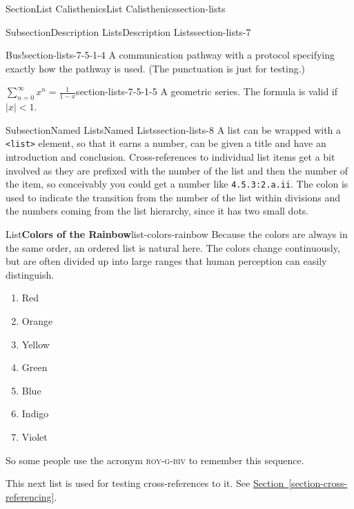 \documentclass[twoside,10pt,]{article}
\newcommand{\xreffont}{\relax}
\newcommand{\mono}[1]{\texttt{#1}}
\newcommand{\acronym}[1]{\textsc{\MakeLowercase{#1}}}
\numberwithin{equation}{section}
\begin{document}
\begin{sectionptx}{Section}{List Calisthenics}{}{List Calisthenics}{}{}{section-lists}
\begin{subsectionptx}{Subsection}{Description Lists}{}{Description Lists}{}{}{section-lists-7}
\begin{descriptionlist}
\begin{dlimedium}{Bus!}{section-lists-7-5-1-4}%
A communication pathway with a protocol specifying exactly how the pathway is used. (The punctuation is just for testing.)%
\end{dlimedium}%
\begin{dlimedium}{\(\displaystyle \sum_{n=0}^\infty x^n = \frac{1}{1-x}\)}{section-lists-7-5-1-5}%
A geometric series.  The formula is valid if \(|x| < 1\).%
\end{dlimedium}%
\end{descriptionlist}
%
\end{subsectionptx}
%
%
\typeout{************************************************}
\typeout{************************************************}
%
\begin{subsectionptx}{Subsection}{Named Lists}{}{Named Lists}{}{}{section-lists-8}
%
%
A list can be wrapped with a \mono{<list>} element, so that it earns a number, can be given a title and have an introduction and conclusion.  Cross-references to individual list items get a bit involved as they are prefixed with the number of the list and then the number of the item, so conceivably you could get a number like \mono{4.5.3:2.a.ii}.  The colon is used to indicate the transition from the number of the list within divisions and the numbers coming from the list hierarchy, since it has two small dots.%
\begin{listptx}{List}{\textbf{Colors of the Rainbow}}{list-colors-rainbow}{}%
Because the colors are always in the same order, an ordered list is natural here.  The colors change continuously, but are often divided up into large ranges that human perception can easily distinguish.%
%
\begin{enumerate}
\item{}Red%
\item\hypertarget{rainbow-orange}{}Orange%
\item{}Yellow%
\item{}Green%
\item{}Blue%
\item{}Indigo%
\item{}Violet%
\end{enumerate}
So some people use the acronym \acronym{ROY-G-BIV} to remember this sequence.%
\end{listptx}%
This next list is used for testing cross-references to it.  See \hyperref[section-cross-referencing]{Section~{\xreffont\ref{section-cross-referencing}}}.%

\end{subsectionptx}
\end{sectionptx}
\end{document}

